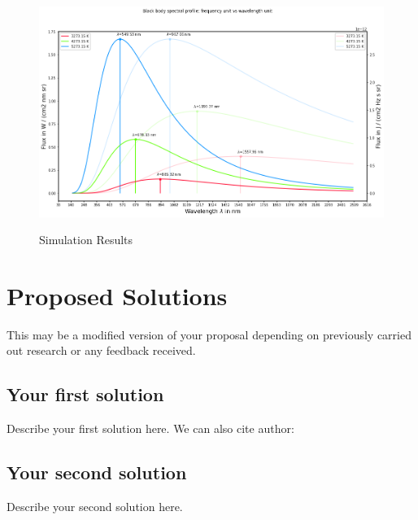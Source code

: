 \documentclass[peerreview]{IEEEtran} %
\begin{document}
%
%
\begin{figure}[!h]
\centering
\includegraphics[width=0.8\columnwidth]{../../figures/black_body_planck.png}\\
\caption{Simulation Results}
\label{fig_sim}
\end{figure}


\section{Proposed Solutions}
This may be a modified version of your proposal depending on previously carried out research or any feedback received.  
\subsection{Your first solution}
Describe your first solution here. We can also cite author: \cite{astroplan1}
\subsection{Your second solution}
Describe your second solution here.
\end{document}
